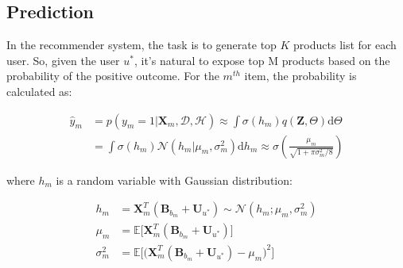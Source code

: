 \subsection{Prediction}

In the recommender system, the task is to generate top $K$ products list for each user. So, given the user $u^*$,  it's natural to expose top M products based on the probability of the positive outcome. For the $m^{th}$ item, the probability is calculated as:

\begin{equation}
\label{prediction}
\begin{split}
\hat{y}_m & = p(y_m=1|\bm{X}_m,\mathcal{D},\mathcal{H}) \approx \int \sigma(h_{m})q(\bm{Z},\Theta)\mathrm{d}\Theta \nonumber \\
& = \int \sigma(h_{m})\mathcal{N}(h_{m}|\mu_{m},\sigma^2_{m})\mathrm{d}h_{m} \approx \sigma(\frac{\mu_{m}}{\sqrt{1+\pi\sigma^2_{m}/8}})
\end{split}
\end{equation}

\noindent where $h_{m}$ is a random variable with Gaussian distribution:

\begin{align*}
 h_{m}  & =\bm{X}_m^T(\bm{B}_{b_m}+\bm{U}_{u^*})  \sim \mathcal{N}(h_{m};\mu_{m},\sigma^2_{m}) \\ 
\mu_{m} & =\mathbb{E}\big[\bm{X}_m^T(\bm{B}_{b_m}+\bm{U}_{u^*})\big] \\ 
\sigma^2_{m} & =\mathbb{E}\Big[\big(\bm{X}_m^T(\bm{B}_{b_m}+\bm{U}_{u^*})-\mu_{m}\big)^2\Big]
\end{align*}
